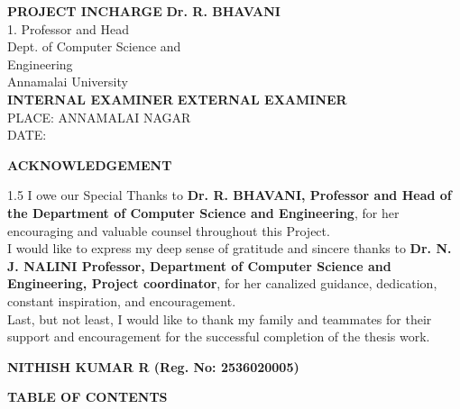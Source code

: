 \documentclass[12pt,a4paper]{report}
\begin{document}
\vspace{2cm}
\noindent \textbf{PROJECT INCHARGE} \hfill \textbf{Dr. R. BHAVANI} \\
1. \null \hfill Professor and Head \\
\null \hfill Dept. of Computer Science and \\
\null \hfill Engineering \\
\null \hfill Annamalai University \\

\vspace{1.5cm}
\noindent \textbf{INTERNAL EXAMINER} \hfill \textbf{EXTERNAL EXAMINER} \\

\vfill
\noindent PLACE: ANNAMALAI NAGAR \\
DATE:

\newpage
\thispagestyle{empty}
\begin{center}
    \textbf{ACKNOWLEDGEMENT}
\end{center}
\vspace{1cm}
\begin{spacing}{1.5}
I owe our Special Thanks to \textbf{Dr. R. BHAVANI, Professor and Head of the Department of Computer Science and Engineering}, for her encouraging and valuable counsel throughout this Project. \\

I would like to express my deep sense of gratitude and sincere thanks to \textbf{Dr. N. J. NALINI Professor, Department of Computer Science and Engineering, Project coordinator}, for her canalized guidance, dedication, constant inspiration, and encouragement. \\

Last, but not least, I would like to thank my family and teammates for their support and encouragement for the successful completion of the thesis work.
\end{spacing}

\vspace{2cm}
\begin{center}
    \textbf{NITHISH KUMAR R \quad (Reg. No: 2536020005)}
\end{center}

\newpage
\thispagestyle{empty}
\begin{center}
    \textbf{TABLE OF CONTENTS}
\end{center}
\vspace{0.5cm}

\renewcommand{\arraystretch}{1.5} 
\end{document}

